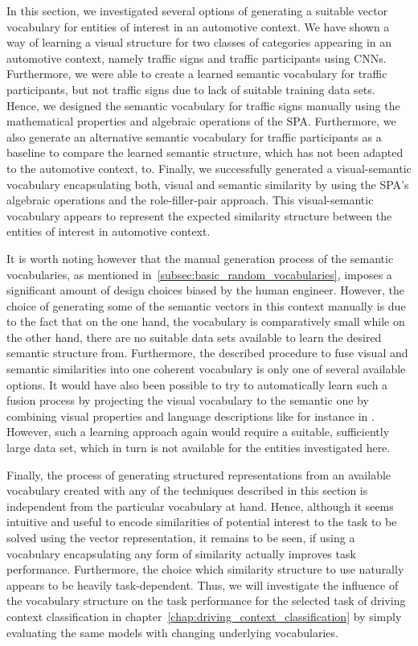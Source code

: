 In this section, we investigated several options of generating a suitable vector vocabulary for entities of interest in an automotive context.
We have shown a way of learning a visual structure for two classes of categories appearing in an automotive context, namely traffic signs and traffic participants using \acp{CNN}.
Furthermore, we were able to create a learned semantic vocabulary for traffic participants, but not traffic signs due to lack of suitable training data sets.
Hence, we designed the semantic vocabulary for traffic signs manually using the mathematical properties and algebraic operations of the \ac{SPA}.
Furthermore, we also generate an alternative semantic vocabulary for traffic participants as a baseline to compare the learned semantic structure, which has not been adapted to the automotive context, to.
Finally, we successfully generated a visual-semantic vocabulary encapsulating both, visual and semantic similarity by using the \ac{SPA}'s algebraic operations and the role-filler-pair approach.
This visual-semantic vocabulary appears to represent the expected similarity structure between the entities of interest in automotive context.

It is worth noting however that the manual generation process of the semantic vocabularies, as mentioned in~\ref{subsec:basic_random_vocabularies}, imposes a significant amount of design choices biased by the human engineer.
However, the choice of generating some of the semantic vectors in this context manually is due to the fact that on the one hand, the vocabulary is comparatively small while on the other hand, there are no suitable data sets available to learn the desired semantic structure from.
Furthermore, the described procedure to fuse visual and semantic similarities into one coherent vocabulary is only one of several available options.
It would have also been possible to try to automatically learn such a fusion process by projecting the visual vocabulary to the semantic one by combining visual properties and language descriptions like for instance in \textcite{Karpathy2017}.
However, such a learning approach again would require a suitable, sufficiently large data set, which in turn is not available for the entities investigated here.

Finally, the process of generating structured representations from an available vocabulary created with any of the techniques described in this section is independent from the particular vocabulary at hand.
Hence, although it seems intuitive and useful to encode similarities of potential interest to the task to be solved using the vector representation, it remains to be seen, if using a vocabulary encapsulating any form of similarity actually improves task performance.
Furthermore, the choice which similarity structure to use naturally appears to be heavily task-dependent.
Thus, we will investigate the influence of the vocabulary structure on the task performance for the selected task of driving context classification in chapter~\ref{chap:driving_context_classification} by simply evaluating the same models with changing underlying vocabularies.

